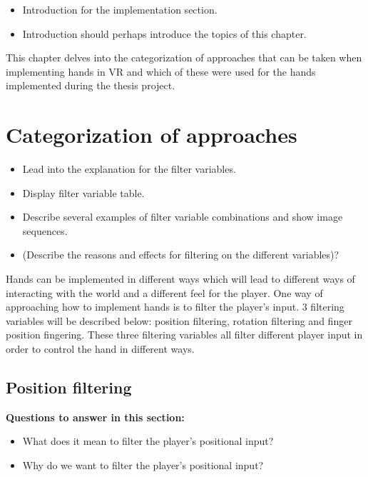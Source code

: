 \begin{itemize}
\item Introduction for the implementation section.
\item Introduction should perhaps introduce the topics of this chapter.
\end{itemize}

This chapter delves into the categorization of approaches that can be taken when implementing hands in VR and which of these were used for the hands implemented during the thesis project.

\section{Categorization of approaches}
\label{sec:categorizationOfApproaches}
\begin{itemize}
\item Lead into the explanation for the filter variables.
\item Display filter variable table.
\item Describe several examples of filter variable combinations and show image sequences.
\item (Describe the reasons and effects for filtering on the different variables)?
\end{itemize}

Hands can be implemented in different ways which will lead to different ways of interacting with the world and a different feel for the player. One way of approaching how to implement hands is to filter the player's input. 3 filtering variables will be described below: position filtering, rotation filtering and finger position fingering. These three filtering variables all filter different player input in order to control the hand in different ways.


\subsection{Position filtering}
\label{subsec:categoryPositionFiltering}
\textbf{Questions to answer in this section:}
\begin{itemize}
\item What does it mean to filter the player's positional input?
\item Why do we want to filter the player's positional input?
\end{itemize}


